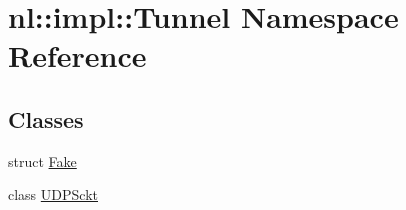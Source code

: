\hypertarget{namespacenl_1_1impl_1_1Tunnel}{}\section{nl\+:\+:impl\+:\+:Tunnel Namespace Reference}
\label{namespacenl_1_1impl_1_1Tunnel}
\subsection*{Classes}
\begin{DoxyCompactItemize}
\item 
struct \hyperlink{structnl_1_1impl_1_1Tunnel_1_1Fake}{Fake}
\item 
class \hyperlink{classnl_1_1impl_1_1Tunnel_1_1UDPSckt}{U\+D\+P\+Sckt}
\end{DoxyCompactItemize}
